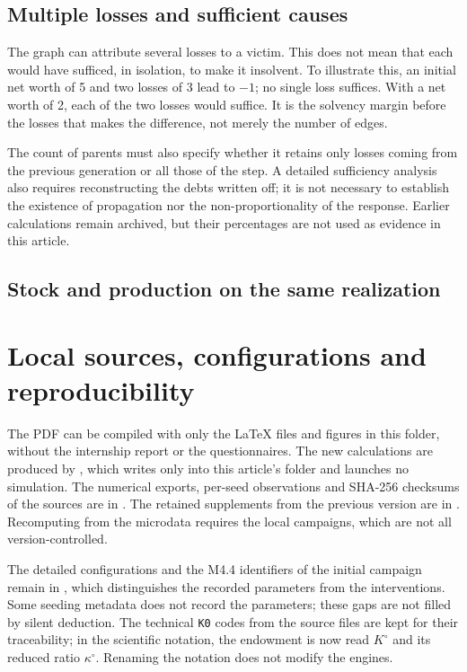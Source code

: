 \subsection{Multiple losses and sufficient causes}
The graph can attribute several losses to a victim.
This does not mean that each would have sufficed, in isolation, to
make it insolvent. To illustrate this, an initial net worth
of 5 and two losses of 3 lead to $-1$; no single loss
suffices. With a net worth of 2, each of the two losses
would suffice. It is the solvency margin before the losses that
makes the difference, not merely the number of edges.

The count of parents must also specify whether it retains only
losses coming from the previous generation or all
those of the step. A detailed sufficiency analysis also requires
reconstructing the debts written off; it is not
necessary to establish the existence of propagation nor the
non-proportionality of the response. Earlier calculations
remain archived, but their percentages are not used
as evidence in this article.

\subsection{Stock and production on the same realization}

\FloatBarrier
\section{Local sources, configurations and reproducibility}\label{sec:sources_revision}
The PDF can be compiled with only the LaTeX files and figures
in this folder, without the internship report or the questionnaires.
The new calculations are produced by
, which writes only into
this article's folder and launches no simulation.
The numerical exports, per-seed observations and
SHA-256 checksums of the sources are in .
The retained supplements from the previous version are in
. Recomputing from the microdata
requires the local campaigns, which are not all version-controlled.

\onecolumn

\twocolumn

The detailed configurations and the M4.4 identifiers of the
initial campaign remain in
, which distinguishes the
recorded parameters from the interventions. Some seeding metadata
does not record the parameters; these gaps are not filled
by silent deduction.
The technical \texttt{K0} codes from the source files are
kept for their traceability; in the scientific notation,
the endowment is now read $K^\circ$ and its reduced ratio
$\kappa^\circ$. Renaming the notation does not modify the engines.


